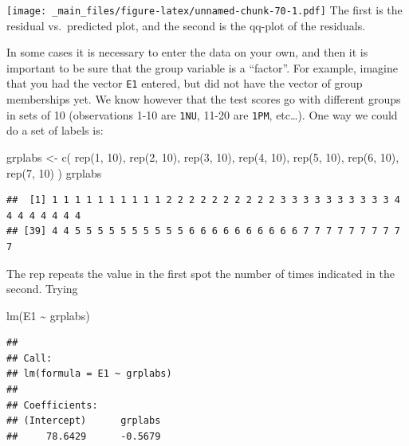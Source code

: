 \documentclass[
]{book}
\newenvironment{Shaded}{\begin{snugshade}}{\end{snugshade}}
\newcommand{\DecValTok}[1]{\textcolor[rgb]{0.00,0.00,0.81}{#1}}
\newcommand{\FunctionTok}[1]{\textcolor[rgb]{0.00,0.00,0.00}{#1}}
\newcommand{\NormalTok}[1]{#1}
\newcommand{\OtherTok}[1]{\textcolor[rgb]{0.56,0.35,0.01}{#1}}
\newcommand{\SpecialCharTok}[1]{\textcolor[rgb]{0.00,0.00,0.00}{#1}}
\begin{document}
\texttt{[image: \_main\_files/figure-latex/unnamed-chunk-70-1.pdf]}
The first is the residual vs.~predicted plot, and the second is the qq-plot of the residuals.

In some cases it is necessary to enter the data on your own, and then it is important to be sure that the group variable is a ``factor''. For example, imagine that you had the vector \texttt{E1} entered, but did not have the vector of group memberships yet. We know however that the test scores go with different groups in sets of 10 (observations 1-10 are \texttt{1NU}, 11-20 are \texttt{1PM}, etc\ldots). One way we could do a set of labels is:

\begin{Shaded}
\begin{Highlighting}[]
\NormalTok{grplabs }\OtherTok{\textless{}{-}} \FunctionTok{c}\NormalTok{(}
  \FunctionTok{rep}\NormalTok{(}\DecValTok{1}\NormalTok{, }\DecValTok{10}\NormalTok{), }\FunctionTok{rep}\NormalTok{(}\DecValTok{2}\NormalTok{, }\DecValTok{10}\NormalTok{), }\FunctionTok{rep}\NormalTok{(}\DecValTok{3}\NormalTok{, }\DecValTok{10}\NormalTok{),}
  \FunctionTok{rep}\NormalTok{(}\DecValTok{4}\NormalTok{, }\DecValTok{10}\NormalTok{), }\FunctionTok{rep}\NormalTok{(}\DecValTok{5}\NormalTok{, }\DecValTok{10}\NormalTok{), }\FunctionTok{rep}\NormalTok{(}\DecValTok{6}\NormalTok{, }\DecValTok{10}\NormalTok{), }\FunctionTok{rep}\NormalTok{(}\DecValTok{7}\NormalTok{, }\DecValTok{10}\NormalTok{)}
\NormalTok{)}
\NormalTok{grplabs}
\end{Highlighting}
\end{Shaded}

\begin{verbatim}
##  [1] 1 1 1 1 1 1 1 1 1 1 2 2 2 2 2 2 2 2 2 2 3 3 3 3 3 3 3 3 3 3 4 4 4 4 4 4 4 4
## [39] 4 4 5 5 5 5 5 5 5 5 5 5 6 6 6 6 6 6 6 6 6 6 7 7 7 7 7 7 7 7 7 7
\end{verbatim}

The rep repeats the value in the first spot the number of times indicated in the second. Trying

\begin{Shaded}
\begin{Highlighting}[]
\FunctionTok{lm}\NormalTok{(E1 }\SpecialCharTok{\textasciitilde{}}\NormalTok{ grplabs)}
\end{Highlighting}
\end{Shaded}

\begin{verbatim}
## 
## Call:
## lm(formula = E1 ~ grplabs)
## 
## Coefficients:
## (Intercept)      grplabs  
##     78.6429      -0.5679
\end{verbatim}
\end{document}
